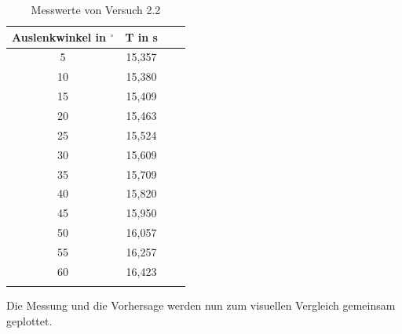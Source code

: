 \begin{table}[h!]
    \begin{center}
        \caption{Messwerte von Versuch 2.2}
        \begin{tabular}{cccc}
            \hline
            Auslenkwinkel in $ ^{\circ}$ & T in s \\
            \hline
            5                  & 15,357 \\
            10                & 15,380 \\
            15                & 15,409 \\
            20                & 15,463 \\
            25                & 15,524 \\
            30                & 15,609 \\
            35                & 15,709 \\
            40                & 15,820 \\
            45                & 15,950 \\
            50                & 16,057 \\
            55                & 16,257 \\
            60                & 16,423 \\
            \hline
            \label{tab:2_2-werte}
        \end{tabular}
    \end{center}
\end{table}


Die Messung und die Vorhersage werden nun zum visuellen Vergleich gemeinsam geplottet.


